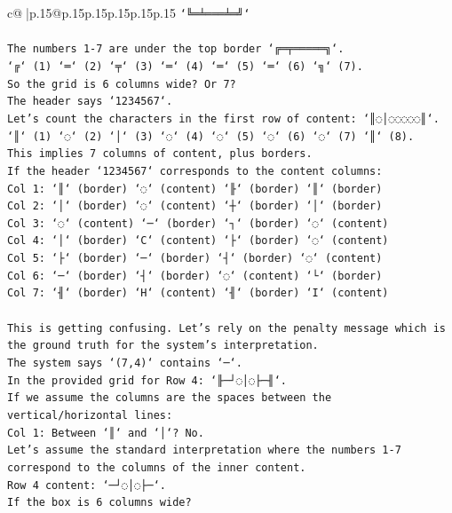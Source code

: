 \documentclass{article}
\begin{document}
{\begin{supertabular}{c@{$\;$}|p{.15\linewidth}@{}p{.15\linewidth}p{.15\linewidth}p{.15\linewidth}p{.15\linewidth}p{.15\linewidth}}
{{{\texttt{`╚═╧═══╧═╝`} \\
\\ 
\texttt{The numbers 1{-}7 are under the top border `╔═╤═════╗`.} \\
\texttt{`╔` (1) `═` (2) `╤` (3) `═` (4) `═` (5) `═` (6) `╗` (7).} \\
\texttt{So the grid is 6 columns wide? Or 7?} \\
\texttt{The header says `1234567`.} \\
\texttt{Let's count the characters in the first row of content: `║◌│◌◌◌◌◌║`.} \\
\texttt{`║` (1) `◌` (2) `│` (3) `◌` (4) `◌` (5) `◌` (6) `◌` (7) `║` (8).} \\
\texttt{This implies 7 columns of content, plus borders.} \\
\texttt{If the header `1234567` corresponds to the content columns:} \\
\texttt{Col 1: `║` (border) `◌` (content) `╟` (border) `║` (border)} \\
\texttt{Col 2: `│` (border) `◌` (content) `┼` (border) `│` (border)} \\
\texttt{Col 3: `◌` (content) `─` (border) `┐` (border) `◌` (content)} \\
\texttt{Col 4: `│` (border) `C` (content) `├` (border) `◌` (content)} \\
\texttt{Col 5: `├` (border) `─` (border) `┤` (border) `◌` (content)} \\
\texttt{Col 6: `─` (border) `┤` (border) `◌` (content) `└` (border)} \\
\texttt{Col 7: `╢` (border) `H` (content) `╢` (border) `I` (content)} \\
\\ 
\texttt{This is getting confusing. Let's rely on the penalty message which is the ground truth for the system's interpretation.} \\
\texttt{The system says `(7,4)` contains `─`.} \\
\texttt{In the provided grid for Row 4: `╟─┘◌│◌├─╢`.} \\
\texttt{If we assume the columns are the spaces between the vertical/horizontal lines:} \\
\texttt{Col 1: Between `║` and `│`? No.} \\
\texttt{Let's assume the standard interpretation where the numbers 1{-}7 correspond to the columns of the inner content.} \\
\texttt{Row 4 content: `─┘◌│◌├─`.} \\
\texttt{If the box is 6 columns wide?} \\
}}}
\end{supertabular}}
\end{document}
